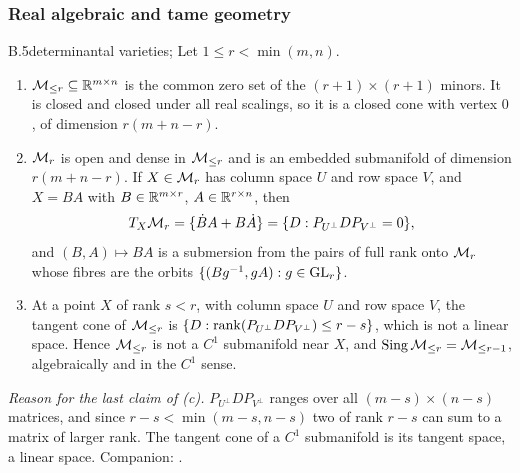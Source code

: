 \subsubsection{Real algebraic and tame geometry}

\begin{auxresult}{B.5}{determinantal varieties}{\citep[Lectures~9, 12 and 14]{xharris1992algebraic};
\citep[Thm~3.2]{xschneider2015convergence}}
Let $1\le r<\min(m,n)$.
\begin{enumerate}[label=(\alph*)]
  \item $\mathcal{M}_{\le r}\subseteq\mathbb{R}^{m\times n}$ is the common zero set of the $(r+1)\times(r+1)$ minors. It is closed and closed
    under all real scalings, so it is a closed cone with vertex $0$, of dimension $r(m+n-r)$.
  \item $\mathcal{M}_r$ is open and dense in $\mathcal{M}_{\le r}$ and is an embedded submanifold of dimension $r(m+n-r)$. If $X\in\mathcal{M}_r$ has
    column space $U$ and row space $V$, and $X=BA$ with $B\in\mathbb{R}^{m\times r}$, $A\in\mathbb{R}^{r\times n}$, then
    \begin{equation*}
      T_X\mathcal{M}_r=\{\dot BA+B\dot A\}=\{D:P_{U^\perp}DP_{V^\perp}=0\},
    \end{equation*}
    and $(B,A)\mapsto BA$ is a submersion from the pairs of full rank onto $\mathcal{M}_r$ whose fibres are the orbits
    $\{(Bg^{-1},gA):g\in\mathrm{GL}_r\}$.
  \item At a point $X$ of rank $s<r$, with column space $U$ and row space $V$, the tangent cone of $\mathcal{M}_{\le r}$ is
    $\{D:\operatorname{rank}(P_{U^\perp}DP_{V^\perp})\le r-s\}$, which is not a linear space. Hence $\mathcal{M}_{\le r}$ is not a $C^1$ submanifold near
    $X$, and $\mathrm{Sing}\,\mathcal{M}_{\le r}=\mathcal{M}_{\le r-1}$, algebraically and in the $C^1$ sense.
\end{enumerate}
\end{auxresult}
\noindent\emph{Reason for the last claim of (c).} $P_{U^\perp}DP_{V^\perp}$ ranges over all $(m-s)\times(n-s)$
matrices, and since $r-s<\min(m-s,n-s)$ two of rank $r-s$ can sum to a matrix of larger rank. The tangent cone of a
$C^1$ submanifold is its tangent space, a linear space. Companion: .

